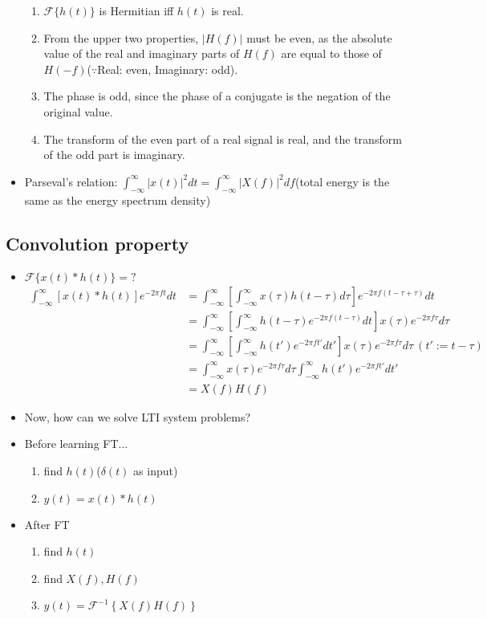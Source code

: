 \documentclass{article}
\begin{document}
\begin{itemize}
\begin{enumerate}
        \item $\mathcal{F}\{h(t)\}$ is Hermitian iff $h(t)$ is real.
        \item From the upper two properties, $|H(f)|$ must be even, as the absolute value of the real and imaginary parts of $H(f)$ are equal to those of $H(-f)$($\because$Real: even, Imaginary: odd). 
        \item The phase is odd, since the phase of a conjugate is the negation of the original value.
        \item The transform of the even part of a real signal is real, and the transform of the odd part is imaginary.
    \end{enumerate}
    \item Parseval's relation: $\displaystyle\int_{-\infty}^{\infty}|x(t)|^2dt=\displaystyle\int_{-\infty}^{\infty}|X(f)|^2df$(total energy is the same as the energy spectrum density)
\end{itemize}
\subsection{Convolution property}
\begin{itemize}
    \item $\mathcal{F}\{x(t)*h(t)\}=?$
    \begin{align*}
    \int_{-\infty}^{\infty}{\left[x(t)*h(t)\right]e^{-2\pi ft}dt}
    &=\int_{-\infty}^{\infty}{\left[\int_{-\infty}^{\infty}{x(\tau)h(t-\tau)d\tau}\right]e^{-2\pi f(t-\tau+\tau)}dt}\\
    &=\int_{-\infty}^{\infty}{\left[\int_{-\infty}^{\infty}{h(t-\tau)e^{-2\pi f(t-\tau)}dt}\right]x(\tau)e^{-2\pi f\tau}d\tau}\\
    &=\int_{-\infty}^{\infty}{\left[\int_{-\infty}^{\infty}{h(t')e^{-2\pi ft'}dt'}\right]x(\tau)e^{-2\pi f\tau}d\tau}\:(t':=t-\tau)\\
    &=\int_{-\infty}^{\infty}{x(\tau)e^{-2\pi f\tau}d\tau}\int_{-\infty}^{\infty}{h(t')e^{-2\pi ft'}dt'}\\
    &=X(f)H(f)
    \end{align*}
    \item Now, how can we solve LTI system problems?
    \item Before learning FT...
    \begin{enumerate}
        \item find $h(t)$($\delta(t)$ as input)
        \item $y(t)=x(t)*h(t)$
    \end{enumerate}
    \item After FT
    \begin{enumerate}
        \item find $h(t)$
        \item find $X(f), H(f)$
        \item $y(t)=\mathcal{F}^{-1}\left\{X(f)H(f)\right\}$
    \end{enumerate}
\end{itemize}
\end{document}
